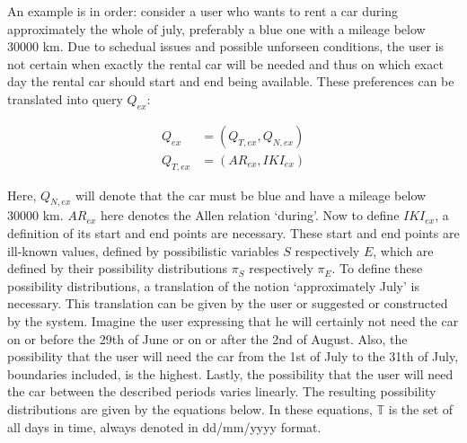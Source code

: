 An example is in order: consider a user who wants to rent a car during approximately the whole of july, preferably a blue one with a mileage below 30000 km. Due to schedual issues and possible unforseen conditions, the user is not certain when exactly the rental car will be needed and thus on which exact day the rental car should start and end being available. These preferences can be translated into query $Q_{ex}$:

\vspace{-10pt}
\begin{align}
Q_{ex} & = (Q_{T,ex}, Q_{N,ex}) \nonumber\\
Q_{T,ex} & = (AR_{ex}, IKI_{ex}) \nonumber
\end{align}

Here, $Q_{N,ex}$ will denote that the car must be blue and have a mileage below 30000 km. $AR_{ex}$ here denotes the Allen relation `during'. Now to define $IKI_{ex}$, a definition of its start and end points are necessary. These start and end points are ill-known values, defined by possibilistic variables $S$ respectively $E$, which are defined by their possibility distributions $\pi_{S}$ respectively $\pi_{E}$. To define these possibility distributions, a translation of the notion `approximately July' is necessary. This translation can be given by the user or suggested or constructed by the system. Imagine the user expressing that he will certainly not need the car on or before the 29th of June or on or after the 2nd of August. Also, the possibility that the user will need the car from the 1st of July to the 31th of July, boundaries included, is the highest. Lastly, the possibility that the user will need the car between the described periods varies linearly. The resulting possibility distributions are given by the equations below. In these equations, $\mathbb{T}$ is the set of all days in time, always denoted in dd/mm/yyyy format.


